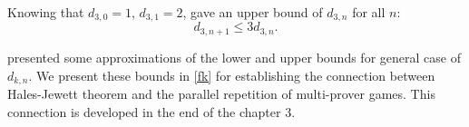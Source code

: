 Knowing that $d_{3,0}=1$, $d_{3,1}=2$,  \cite{polymath2010density} gave an upper bound of $d_{3,n}$ for all $n$: $$d_{3,n+1} \leq 3 d_{3,n}.$$

\cite{polymath2010density} presented some approximations of the lower and upper bounds for general case of $d_{k,n}.$ We present these bounds in \eqref{fk} for establishing the connection between Hales-Jewett theorem and the parallel repetition of multi-prover games. This connection is developed in the end of the  chapter 3. 


 
 
 





















